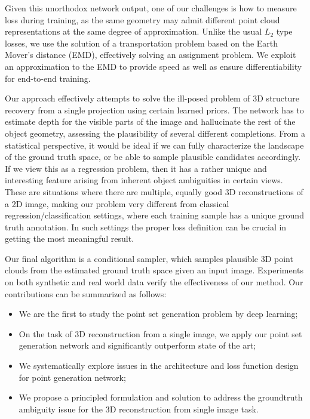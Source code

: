 \documentclass[10pt,twocolumn,letterpaper]{article}
\newcommand{\denselist}{\itemsep 0pt\parsep=0pt\partopsep 0pt\vspace{-2pt}}
\newcommand{\bitem}{\begin{itemize}\denselist}
\newcommand{\eitem}{\end{itemize}}
\begin{document}
Given this unorthodox network output, one of our challenges is how to measure loss during training, as the same geometry may admit different point cloud representations at the same degree of approximation. Unlike the usual $L_2$ type losses, we use the solution of a transportation problem based on the Earth Mover's distance (EMD), effectively solving an assignment problem. We exploit an approximation to the EMD to provide speed as well as ensure differentiability for end-to-end training.

Our approach effectively attempts to solve the ill-posed problem of 3D structure recovery from a single projection using certain learned priors. The network has to estimate depth for the visible parts of the image and hallucinate the rest of the object geometry, assessing the plausibility of several different completions. From a statistical perspective, it would be ideal if we can fully characterize the landscape of the ground truth space, or be able to sample plausible candidates accordingly. If we view this as a regression problem, then it has a rather unique and interesting feature arising from inherent object ambiguities in certain views. These are situations where there are multiple, equally good 3D reconstructions of a 2D image, making our problem very different from classical regression/classification settings, where each training sample has a unique ground truth annotation. In such settings the proper loss definition can be crucial in getting the most meaningful result.

Our final algorithm is a conditional sampler, which samples plausible 3D point clouds from the estimated ground truth space given an input image. Experiments on both synthetic and real world data verify the effectiveness of our method. %
Our contributions can be summarized as follows:
\bitem\item We are the first to study the point set generation problem by deep learning; 
  \item On the task of 3D reconstruction from a single image, we apply our point set generation network and significantly outperform state of the art;
  \item We systematically explore issues in the architecture and loss function design for point generation network;
  \item We propose a principled formulation and solution to address the groundtruth ambiguity issue for the 3D reconstruction from single image task.
\eitem
\end{document}
